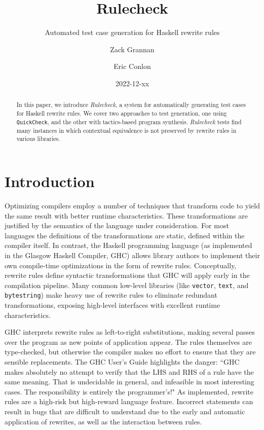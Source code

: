 \documentclass[format=sigconf, nonacm=true, review=true, screen=true]{acmart}
\title{Rulecheck}
\subtitle{Automated test case generation for Haskell rewrite rules}
\author{Zack Grannan}
\author{Eric Conlon}
\date{2022-12-xx}
\newcommand{\Rulecheck}{\textit{Rulecheck}\xspace}
\begin{document}
\begin{abstract}

In this paper, we introduce \Rulecheck, a system for automatically generating test cases for Haskell rewrite rules. We cover two approaches to test generation, one using \texttt{QuickCheck}, and the other with tactics-based program synthesis. \Rulecheck tests find many instances in which contextual equivalence is not preserved by rewrite rules in various libraries.

\end{abstract}

\maketitle

\section{Introduction}

Optimizing compilers employ a number of techniques that transform code to yield the same result with better runtime characteristics. These transformations are justified by the semantics of the language under consideration. For most languages the definitions of the transformations are static, defined within the compiler itself. In contrast, the Haskell programming language (as implemented in the Glasgow Haskell Compiler, GHC) allows library authors to implement their own compile-time optimizations in the form of rewrite rules. Conceptually, rewrite rules define syntactic transformations that GHC will apply early in the compilation pipeline. Many common low-level libraries (like \texttt{vector}, \texttt{text}, and \texttt{bytestring}) make heavy use of rewrite rules to eliminate redundant transformations, exposing high-level interfaces with excellent runtime characteristics. \cite{coutts2007stream, chakravarty2002approach, chakravarty2007data, shortcutwiki}

GHC interprets rewrite rules as left-to-right substitutions, making several passes over the program as new points of application appear. The rules themselves are type-checked, but otherwise the compiler makes no effort to ensure that they are sensible replacements. The GHC User's Guide highlights the danger: ``GHC makes absolutely no attempt to verify that the LHS and RHS of a rule have the same meaning. That is undecidable in general, and infeasible in most interesting cases. The responsibility is entirely the programmer's!" \cite{userguide} As implemented, rewrite rules are a high-risk but high-reward language feature. Incorrect statements can result in bugs that are difficult to understand due to the early and automatic application of rewrites, as well as the interaction between rules.
\end{document}

